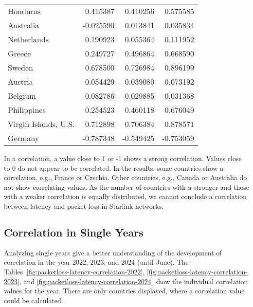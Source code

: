 \begin{table}[ht]
\begin{tabular}{lrrr}
		Honduras                    & 0.415387    & 0.410256    & 0.575585    \\
		Australia                   & -0.025590   & 0.013841    & 0.035834    \\
		Netherlands                 & 0.190923    & 0.055364    & 0.111952    \\
		Greece                      & 0.249727    & 0.496864    & 0.668590    \\
		Sweden                      & 0.678500    & 0.726984    & 0.896199    \\
		Austria                     & 0.054429    & 0.039080    & 0.073192    \\
		Belgium                     & -0.082786   & -0.029885   & -0.031368   \\
		Philippines                 & 0.254523    & 0.460118    & 0.676049    \\
		Virgin Islands, U.S.        & 0.712898    & 0.706384    & 0.878571    \\
		Germany                     & -0.787348   & -0.549425   & -0.753059   \\
		\bottomrule
	\end{tabular}
\end{table}

In a correlation, a value close to 1 or -1 shows a strong correlation. Values close to 0 do not appear to be correlated.
In the results, some countries show a correlation, e.g., France or Czechia. Other countries, e.g., Canada or Australia do not show correlating values.
As the number of countries with a stronger and those with a weaker correlation is equally distributed, we cannot conclude a correlation between latency and packet loss in Starlink networks.

\subsection{Correlation in Single Years}

Analyzing single years give a better understanding of the development of correlation in the year 2022, 2023, and 2024 (until June).
The Tables~\ref{fig:packetloss-latency-correlation-2022}, \ref{fig:packetloss-latency-correlation-2023}, and \ref{fig:packetloss-latency-correlation-2024} show the individual correlation values for the year. There are only countries displayed, where a correlation value could be calculated.

